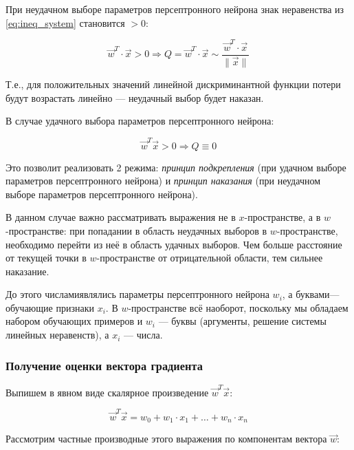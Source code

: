 \documentclass{article}
\numberwithin{equation}{subsection}
\begin{document}
При неудачном выборе параметров персептронного нейрона знак неравенства 
из \ref{eq:ineq_system} становится $>0$:

\begin{equation}
    \vec{w}^T \cdot \vec{x} >0 \Rightarrow Q = \vec{w}^T \cdot \vec{x} \sim \dfrac{\vec{w}^T \cdot \vec{x}}{\| \vec{x} \|}
\end{equation}

Т.е., для положительных значений линейной дискриминантной функции потери будут
возрастать линейно --- неудачный выбор будет \glqq наказан\grqq.

В случае удачного выбора параметров персептронного нейрона:

\begin{equation}
    \vec{w}^T \vec{x} >0 \Rightarrow Q \equiv 0
\end{equation}

Это позволит реализовать 2 режима: \textit{принцип подкрепления} (при удачном
выборе параметров персептронного нейрона) и \textit{принцип наказания} 
(при неудачном выборе параметров персептронного нейрона).

В данном случае важно рассматривать выражения не в $x$-пространстве, 
а в $w$-пространстве: при попадании в область неудачных выборов в $w$-пространстве,
необходимо перейти из неё в область удачных выборов. Чем больше расстояние от текущей
точки в $w$-пространстве от отрицательной области, тем сильнее \glqq наказание\grqq.

До этого \glqq числами\grqq являлись параметры персептронного нейрона $w_i$, а 
\glqq буквами\grqq --- обучающие признаки $x_i$. В $w$-пространстве всё наоборот,
поскольку мы обладаем набором обучающих примеров и $w_i$ --- \glqq буквы\grqq
(аргументы, решение системы линейных неравенств), а $x_i$ --- \glqq числа\grqq.





\subsubsection{Получение оценки вектора градиента}

Выпишем в явном виде скалярное произведение $\vec{w}^T \vec{x}$:

\begin{equation}
    \vec{w}^T \vec{x} = w_0 + w_1 \cdot x_1 + \dots + w_n \cdot x_n
\end{equation}

Рассмотрим частные производные этого выражения по компонентам вектора $\vec{w}$:
\end{document}
